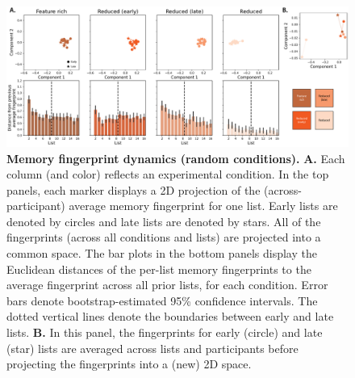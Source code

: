 \documentclass{article}
\begin{document}
\begin{figure}[tp] \centering
    \includegraphics[width=\textwidth]{figures/fingerprint_trajectories_random}
    
    \caption{\textbf{Memory fingerprint dynamics (random conditions).}
    \textbf{A.} Each column (and color) reflects an experimental condition. In
    the top panels, each marker displays a 2D projection of the
    (across-participant) average memory fingerprint for one list. Early lists
    are denoted by circles and late lists are denoted by stars. All of the
    fingerprints (across all conditions and lists) are projected into a common
    space. The bar plots in the bottom panels display the Euclidean distances
    of the per-list memory fingerprints to the average fingerprint across all
    prior lists, for each condition. Error bars denote bootstrap-estimated 95\%
    confidence intervals. The dotted vertical lines denote the boundaries
    between early and late lists. \textbf{B.} In this panel, the fingerprints
    for early (circle) and late (star) lists are averaged across lists and
    participants before projecting the fingerprints into a (new) 2D space.}
    \label{fig:fingerprint-trajectories-random}
    
    \end{figure}
\end{document}
